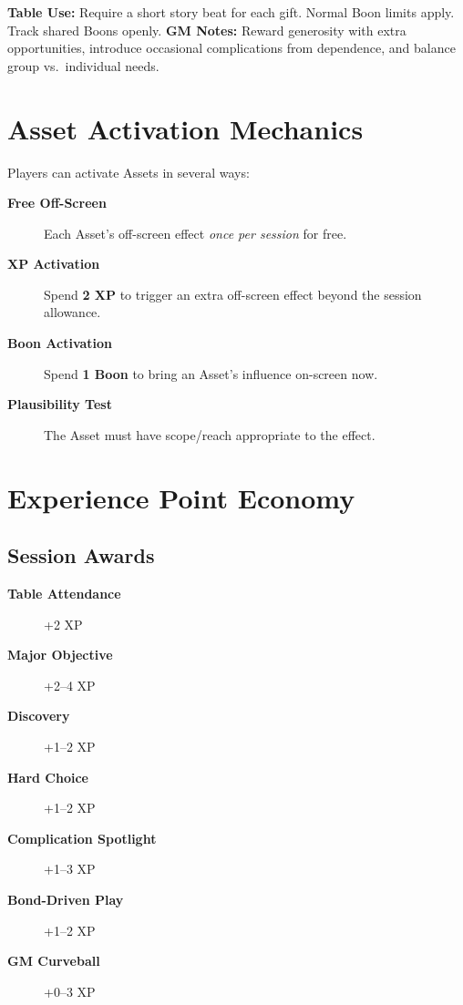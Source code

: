 \textbf{Table Use:} Require a short story beat for each gift. Normal Boon limits apply. Track shared Boons openly.  
\textbf{GM Notes:} Reward generosity with extra opportunities, introduce occasional complications from dependence, and balance group vs.\ individual needs.

\section{Asset Activation Mechanics}
\label{sec:asset-activations}
Players can activate Assets in several ways:
\begin{description}
\item[\textbf{Free Off-Screen}] Each Asset's off-screen effect \emph{once per session} for free. 
\item[\textbf{XP Activation}] Spend \textbf{2 XP} to trigger an extra off-screen effect beyond the session allowance. 
\item[\textbf{Boon Activation}] Spend \textbf{1 Boon} to bring an Asset's influence on-screen now. 
\item[\textbf{Plausibility Test}] The Asset must have scope/reach appropriate to the effect. 
\end{description}

\section{Experience Point Economy}
\label{sec:xp-economy}

\subsection{Session Awards}
\label{subsec:session-awards}
\begin{description}
\item[\textbf{Table Attendance}] +2 XP
\item[\textbf{Major Objective}] +2–4 XP
\item[\textbf{Discovery}] +1–2 XP
\item[\textbf{Hard Choice}] +1–2 XP
\item[\textbf{Complication Spotlight}] +1–3 XP
\item[\textbf{Bond-Driven Play}] +1–2 XP
\item[\textbf{GM Curveball}] +0–3 XP
\end{description}

